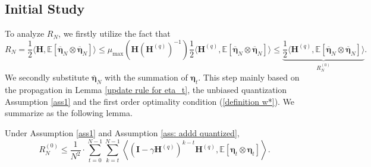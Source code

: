 \documentclass[11pt, letterpaper]{article}
\begin{document}
\subsection{Initial Study}
\label{Initial study R2}
To analyze $R_N$, we firstly utilize the fact that
\begin{equation}
    \label{eq: c1}
    R_N=\frac{1}{2}\langle\mathbf{H},\mathbb{E}[\overline{\boldsymbol{\eta}}_N\otimes\overline{\boldsymbol{\eta}}_N]\rangle\leq \mu_{\max}\left(\mathbf{H}(\mathbf{H}^{(q)})^{-1}\right)\frac{1}{2}\langle\mathbf{H}^{(q)},\mathbb{E}[\overline{\boldsymbol{\eta}}_N\otimes\overline{\boldsymbol{\eta}}_N]\rangle\leq \underbrace{\frac{1}{2}\langle\mathbf{H}^{(q)},\mathbb{E}[\overline{\boldsymbol{\eta}}_N\otimes\overline{\boldsymbol{\eta}}_N]\rangle}_{R_N^{(0)}}.
\end{equation}
We secondly substitute $\overline{\boldsymbol{\eta}}_{N}$ with the summation of $\boldsymbol{\eta}_t$. This step mainly based on the propagation in Lemma \ref{update rule for eta_t}, the unbiased quantization Assumption \ref{ass1} and the first order optimality condition (\ref{definition w*}). We summarize as the following lemma.
\begin{lemma}
    \label{Initial study of R_2}
    Under Assumption \ref{ass1} and Assumption \ref{ass: addd quantized},
    \begin{equation*}
        R_N^{(0)}\leq \frac{1}{N^2}\cdot\sum_{t=0}^{N-1}\sum_{k=t}^{N-1}\left\langle(\mathbf{I}-\gamma\mathbf{H}^{(q)})^{k-t}\mathbf{H}^{(q)},\mathbb{E}[\boldsymbol{\eta}_t\otimes\boldsymbol{\eta}_t]\right\rangle.
    \end{equation*}
\end{lemma}
\end{document}
